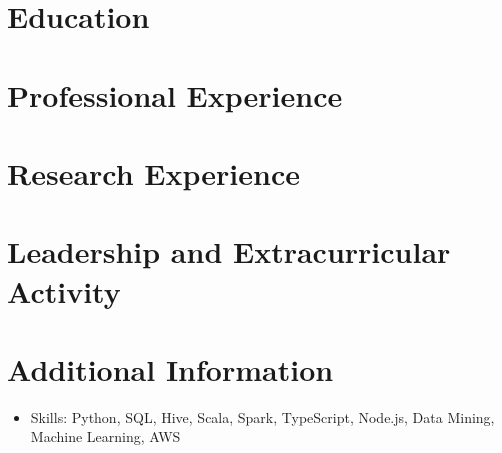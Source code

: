 \documentclass{resumeEN}
\begin{document}
\section{Education}

\pennmaster
\thuundergrad

\section{Professional Experience}

\amazon
\msra
\bytedance

\section{Research Experience}

\ryanresearch

\section{Leadership and Extracurricular Activity}

\eydatascience
\cnkibibtex

\section{Additional Information}

\vspace{0.618ex}
\begin{itemize}
\item Skills: Python, SQL, Hive, Scala, Spark, TypeScript, Node.js, Data Mining, Machine Learning, AWS
\end{itemize}
\end{document}
